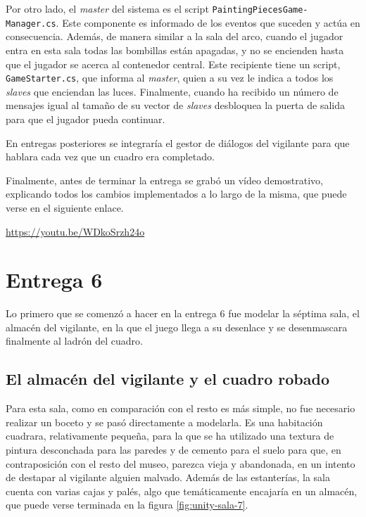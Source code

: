 Por otro lado, el \textit{master} del sistema es el script \texttt{PaintingPiecesGame-} \texttt{Manager.cs}. Este componente es informado de los eventos que suceden y actúa en consecuencia. Además, de manera similar a la sala del arco, cuando el jugador entra en esta sala todas las bombillas están apagadas, y no se encienden hasta que el jugador se acerca al contenedor central. Este recipiente tiene un script, \texttt{GameStarter.cs}, que informa al \textit{master}, quien a su vez le indica a todos los \textit{slaves} que enciendan las luces. Finalmente, cuando ha recibido un número de mensajes igual al tamaño de su vector de \textit{slaves} desbloquea la puerta de salida para que el jugador pueda continuar.

En entregas posteriores se integraría el gestor de diálogos del vigilante para que hablara cada vez que un cuadro era completado.

Finalmente, antes de terminar la entrega se grabó un vídeo demostrativo, explicando todos los cambios implementados a lo largo de la misma, que puede verse en el siguiente enlace.

\begin{center}
    \url{https://youtu.be/WDkoSrzh24o}
\end{center}



\section{Entrega 6}

Lo primero que se comenzó a hacer en la entrega 6 fue modelar la séptima sala, el almacén del vigilante, en la que el juego llega a su desenlace y se desenmascara finalmente al ladrón del cuadro.

\subsection{El almacén del vigilante y el cuadro robado}

Para esta sala, como en comparación con el resto es más simple, no fue necesario realizar un boceto y se pasó directamente a modelarla. Es una habitación cuadrara, relativamente pequeña, para la que se ha utilizado una textura de pintura desconchada para las paredes y de cemento para el suelo para que, en contraposición con el resto del museo, parezca vieja y abandonada, en un intento de destapar al vigilante alguien malvado. Además de las estanterías, la sala cuenta con varias cajas y palés, algo que temáticamente encajaría en un almacén, que puede verse terminada en la figura \ref{fig:unity-sala-7}.

